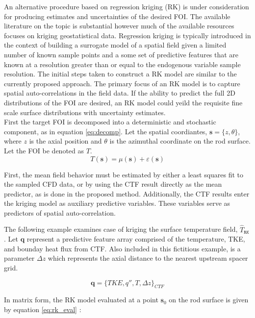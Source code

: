 An alternative procedure based on regression kriging (RK) is under consideration for producing estimates and uncertainties of the desired FOI.
The available literature on the topic is substantial however much of the available resources focuses on kriging geostatistical data.  Regression kriging is typically introduced in the context of building
a surrogate model of a spatial field given a limited number of known sample points and a some set of predictive features that are known at a resolution greater than or equal to the endogenous variable sample resolution.
The initial steps taken to construct a RK model are similar to the currently proposed approach.  The primary focus of an RK model is to capture spatial auto-correlations in the field data.   If the ability to predict the full 2D distributions of the FOI are desired, an RK model could yeild the requisite fine scale surface distributions with uncertainty estimates. \\

First the target FOI is decomposed into a deterministic and stochastic component, as in equation \ref{eq:decomp}.
Let the spatial coordiantes, $\mathbf{s} = \{z, \theta\}$,
where $z$ is the axial position and $\theta$ is the azimuthal coordinate on the rod surface. Let the FOI be denoted as $T$.
\begin{equation}
T(\mathbf s) = \mu(\mathbf s) + \varepsilon(\mathbf s)
\label{eq:decomp}
\end{equation}

First, the mean field behavior must be estimated by either a least squares fit to the sampled CFD data, or by using the CTF result directly as the mean predictor, as is done in the proposed method. 
Additionally, the CTF results enter the kriging model as auxiliary predictive variables.  These variables serve as predictors of spatial auto-correlation.

The following example examines case of kriging the surface temperature field, $\hat T_\mathtt{RK}$.
Let $\mathbf{q}$ represent a predictive feature array comprised of the temperature,
TKE, and bounday heat flux from CTF.  Also included in this fictitious example, is a parameter $\Delta z$ which represents the axial distance to the nearest upstream spacer grid.

\begin{equation}
\mathbf{q} = \{TKE, q'', T, \Delta z \}_{CTF}
\end{equation}

In matrix form, the RK model evaluated at a point $\mathbf{s}_0 $ on the rod surface is given by equation \ref{eq:rk_eval} \cite{Hengl07}:

